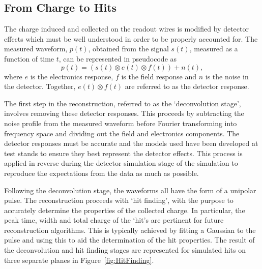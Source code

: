 \subsection{From Charge to Hits}\label{sec:HitReconstruction}

The charge induced and collected on the readout wires is modified by detector effects which must be well understood in order to be properly accounted for.  The measured waveform, $p(t)$, obtained from the signal $s(t)$, measured as a function of time $t$, can be represented in pseudocode as
\begin{equation}
  p(t) = \left( s(t) \otimes e(t) \otimes f(t) \right) + n(t),
\end{equation}
where $e$ is the electronics response, $f$ is the field response and $n$ is the noise in the detector.  Together, $e(t) \otimes f(t)$ are referred to as the detector response.

The first step in the reconstruction, referred to as the `deconvolution stage', involves removing these detector responses.  This proceeds by subtracting the noise profile from the measured waveform before Fourier transforming into frequency space and dividing out the field and electronics components.  The detector responses must be accurate and the models used have been developed at test stands to ensure they best represent the detector effects.  This process is applied in reverse during the detector simulation stage of the simulation to reproduce the expectations from the data as much as possible.

Following the deconvolution stage, the waveforms all have the form of a unipolar pulse.  The reconstruction proceeds with `hit finding', with the purpose to accurately determine the properties of the collected charge.  In particular, the peak time, width and total charge of the `hit's are pertinent for future reconstruction algorithms.  This is typically achieved by fitting a Gaussian to the pulse and using this to aid the determination of the hit properties.  The result of the deconvolution and hit finding stages are represented for simulated hits on three separate planes in Figure~\ref{fig:HitFinding}.

